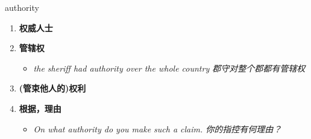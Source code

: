
\begin{frame}
{\huge authority}
\begin{center}
\begin{enumerate}\Large
  \item \textbf{权威人士}
  \item \textbf{管辖权}
  \begin{itemize}
    \item \em{\Large{the sheriff had authority over the whole country 郡守对整个郡都有管辖权}}
  \end{itemize}
  \item \textbf{(管束他人的)权利}
  \item \textbf{根据，理由}
  \begin{itemize}
    \item \em{\Large{On what authority do you make such a claim. 你的指控有何理由？}}
  \end{itemize}
\end{enumerate}
\end{center}
\end{frame}
